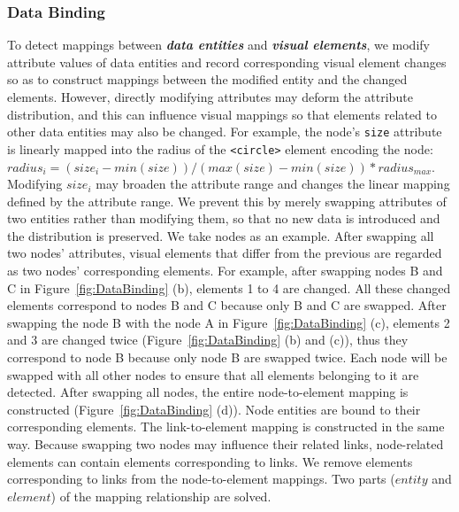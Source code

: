 \subsubsection{Data Binding} \label{sec:databinding}
To detect mappings between \textbf{\textit{data entities}} and \textbf{\textit{visual elements}}, 
we modify attribute values of data entities and record corresponding visual element changes so as to construct mappings between the modified entity and the changed elements.
However, directly modifying attributes may deform the attribute distribution, and this can influence visual mappings so that elements related to other data entities may also be changed.
For example, the node's \texttt{size} attribute is linearly mapped into the radius of the \texttt{<circle>} element encoding the node: 
$radius_i = (size_i - min(size)) / (max(size) - min(size)) * radius_{max}$.
Modifying $size_i$ may broaden the attribute range and changes the linear mapping defined by the attribute range.
We prevent this by merely swapping attributes of two entities rather than modifying them, so that no new data is introduced and the distribution is preserved.
We take nodes as an example.
After swapping all two nodes' attributes, visual elements that differ from the previous are regarded as two nodes' corresponding elements.
For example, after swapping nodes B and C in Figure~\ref{fig:DataBinding} (b), elements 1 to 4 are changed.
All these changed elements correspond to nodes B and C because only B and C are swapped.
After swapping the node B with the node A in Figure~\ref{fig:DataBinding} (c), elements 2 and 3 are changed twice (Figure~\ref{fig:DataBinding} (b) and (c)), thus they correspond to node B because only node B are swapped twice.
Each node will be swapped with all other nodes to ensure that all elements belonging to it are detected.
After swapping all nodes, the entire node-to-element mapping is constructed (Figure~\ref{fig:DataBinding} (d)).
Node entities are bound to their corresponding elements.
The link-to-element mapping is constructed in the same way.
Because swapping two nodes may influence their related links, node-related elements can contain elements corresponding to links.
We remove elements corresponding to links from the node-to-element mappings.
Two parts ($entity$ and $element$) of the mapping relationship are solved.


